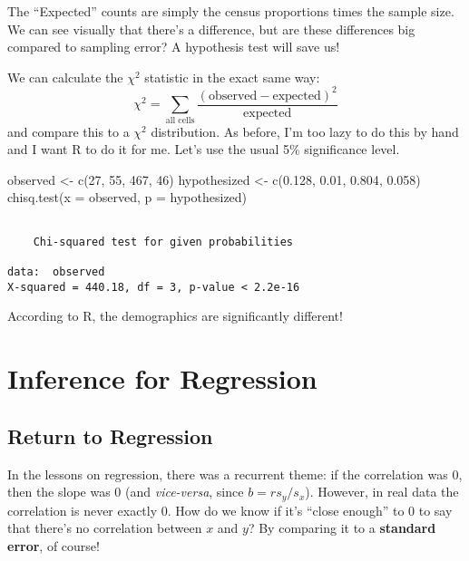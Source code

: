 \documentclass[
  letterpaper,
  DIV=11,
  numbers=noendperiod]{scrreprt}
\newenvironment{Shaded}{\begin{snugshade}}{\end{snugshade}}
\newcommand{\AttributeTok}[1]{\textcolor[rgb]{0.40,0.45,0.13}{#1}}
\newcommand{\DecValTok}[1]{\textcolor[rgb]{0.68,0.00,0.00}{#1}}
\newcommand{\FloatTok}[1]{\textcolor[rgb]{0.68,0.00,0.00}{#1}}
\newcommand{\FunctionTok}[1]{\textcolor[rgb]{0.28,0.35,0.67}{#1}}
\newcommand{\NormalTok}[1]{\textcolor[rgb]{0.00,0.23,0.31}{#1}}
\newcommand{\OtherTok}[1]{\textcolor[rgb]{0.00,0.23,0.31}{#1}}
\begin{document}
The ``Expected'' counts are simply the census proportions times the
sample size. We can see visually that there's a difference, but are
these differences big compared to sampling error? A hypothesis test will
save us!

We can calculate the \(\chi^2\) statistic in the exact same way: \[
\chi^2 = \sum_{\text{all cells}}\frac{(\text{observed} - \text{expected})^2}{\text{expected}}
\] and compare this to a \(\chi^2\) distribution. As before, I'm too
lazy to do this by hand and I want R to do it for me. Let's use the
usual 5\% significance level.

\begin{Shaded}
\begin{Highlighting}[]
\NormalTok{observed }\OtherTok{\textless{}{-}} \FunctionTok{c}\NormalTok{(}\DecValTok{27}\NormalTok{, }\DecValTok{55}\NormalTok{, }\DecValTok{467}\NormalTok{, }\DecValTok{46}\NormalTok{)}
\NormalTok{hypothesized }\OtherTok{\textless{}{-}} \FunctionTok{c}\NormalTok{(}\FloatTok{0.128}\NormalTok{, }\FloatTok{0.01}\NormalTok{, }\FloatTok{0.804}\NormalTok{, }\FloatTok{0.058}\NormalTok{)}
\FunctionTok{chisq.test}\NormalTok{(}\AttributeTok{x =}\NormalTok{ observed, }\AttributeTok{p =}\NormalTok{ hypothesized)}
\end{Highlighting}
\end{Shaded}

\begin{verbatim}

    Chi-squared test for given probabilities

data:  observed
X-squared = 440.18, df = 3, p-value < 2.2e-16
\end{verbatim}

According to R, the demographics are significantly different!

\hypertarget{inference-for-regression}{%
\chapter{Inference for Regression}\label{inference-for-regression}}

\hypertarget{return-to-regression}{%
\section{Return to Regression}\label{return-to-regression}}

In the lessons on regression, there was a recurrent theme: if the
correlation was 0, then the slope was 0 (and \emph{vice-versa}, since
\(b = rs_y/s_x\)). However, in real data the correlation is never
exactly 0. How do we know if it's ``close enough'' to 0 to say that
there's no correlation between \(x\) and \(y\)? By comparing it to a
\textbf{standard error}, of course!
\end{document}

